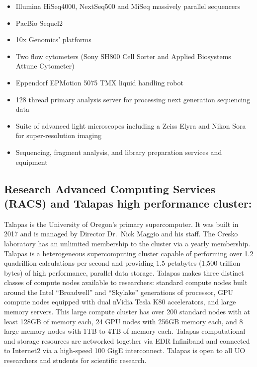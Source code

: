 \documentclass[
]{book}
\providecommand{\tightlist}{%
  \setlength{\itemsep}{0pt}\setlength{\parskip}{0pt}}
\begin{document}
\begin{itemize}
\tightlist
\item
  Illumina HiSeq4000, NextSeq500 and MiSeq massively parallel sequencers
\item
  PacBio Sequel2
\item
  10x Genomics' platforms
\item
  Two flow cytometers (Sony SH800 Cell Sorter and Applied Biosystems Attune Cytometer)
\item
  Eppendorf EPMotion 5075 TMX liquid handling robot
\item
  128 thread primary analysis server for processing next generation sequencing data
\item
  Suite of advanced light microscopes including a Zeiss Elyra and Nikon Sora for super-resolution imaging
\item
  Sequencing, fragment analysis, and library preparation services and equipment
\end{itemize}

\hypertarget{research-advanced-computing-services-racs-and-talapas-high-performance-cluster}{%
\subsection{Research Advanced Computing Services (RACS) and Talapas high performance cluster:}\label{research-advanced-computing-services-racs-and-talapas-high-performance-cluster}}

Talapas is the University of Oregon's primary supercomputer. It was built in 2017 and is managed by Director Dr.~Nick Maggio and his staff. The Cresko laboratory has an unlimited membership to the cluster via a yearly membership. Talapas is a heterogeneous supercomputing cluster capable of performing over 1.2 quadrillion calculations per second and providing 1.5 petabytes (1,500 trillion bytes) of high performance, parallel data storage. Talapas makes three distinct classes of compute nodes available to researchers: standard compute nodes built around the Intel ``Broadwell'' and ``Skylake'' generations of processor, GPU compute nodes equipped with dual nVidia Tesla K80 accelerators, and large memory servers. This large compute cluster has over 200 standard nodes with at least 128GB of memory each, 24 GPU nodes with 256GB memory each, and 8 large memory nodes with 1TB to 4TB of memory each. Talapas computational and storage resources are networked together via EDR Infiniband and connected to Internet2 via a high-speed 100 GigE interconnect. Talapas is open to all UO researchers and students for scientific research.
\end{document}
